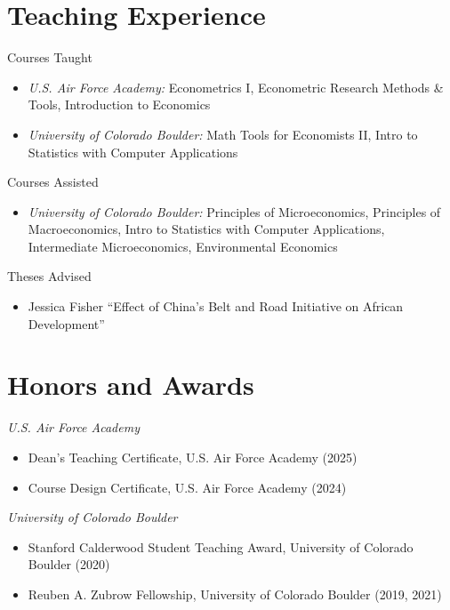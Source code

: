 \documentclass[letterpaper]{article}
\begin{document}
\section*{Teaching Experience}
  Courses Taught 
  \begin{itemize}[topsep=2pt,itemsep=-1pt,leftmargin=1em]
    \item[] \textit{U.S. Air Force Academy:} Econometrics I, Econometric Research Methods \& Tools, Introduction to Economics
    \item[] \textit{University of Colorado Boulder:} Math Tools for Economists II, Intro to Statistics with Computer Applications
  \end{itemize}
  \vspace*{.5em}
	Courses Assisted
	\begin{itemize}[topsep=2pt,itemsep=-1pt,leftmargin=1em]
    \item[] \textit{University of Colorado Boulder:} Principles of Microeconomics, Principles of Macroeconomics, Intro to Statistics with Computer Applications, Intermediate Microeconomics, Environmental Economics
  \end{itemize}
  \vspace*{.5em}
  Theses Advised
  \begin{itemize}[topsep=2pt,itemsep=-1pt,leftmargin=1em]
    \item[] Jessica Fisher ``Effect of China's Belt and Road Initiative on African Development'' 
  \end{itemize}

\section*{Honors and Awards}
  \textit{U.S. Air Force Academy}
  \begin{itemize}[topsep=2pt,itemsep=-1pt,leftmargin=1em]
    \item[] Dean's Teaching Certificate, U.S. Air Force Academy (2025)
    \item[] Course Design Certificate, U.S. Air Force Academy (2024)
  \end{itemize}
  \vspace*{.5em}
\textit{University of Colorado Boulder}
  \begin{itemize}[topsep=2pt,itemsep=-1pt,leftmargin=1em]
    \item[] Stanford Calderwood Student Teaching Award, University of Colorado Boulder (2020)
    \item[] Reuben A. Zubrow Fellowship, University of Colorado Boulder (2019, 2021)
  \end{itemize}
\end{document}
